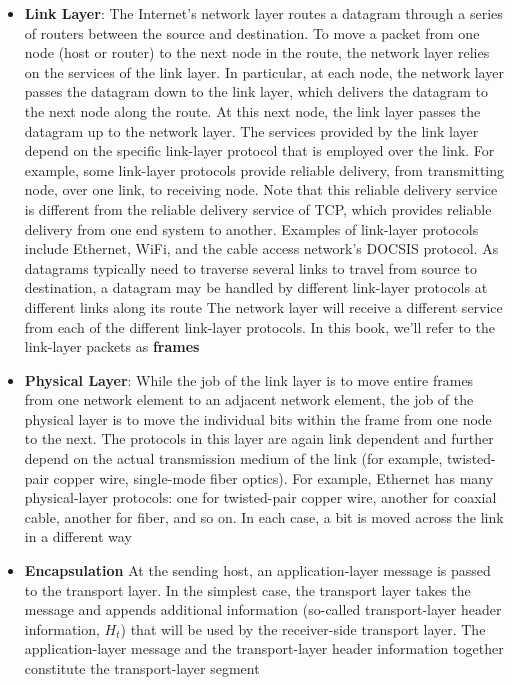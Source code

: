 \documentclass{report}
\begin{document}
\begin{itemize}
        \item \textbf{Link Layer}:  The Internet’s network layer routes a datagram through a series of routers between the source and destination. To move a packet from one node (host or router) to the next node in the route, the network layer relies on the services of the link layer. In particular, at each node, the network layer passes the datagram down to the link layer, which delivers the datagram to the next node along the route. At this next node, the link layer passes the datagram up to the network layer.
            \bigbreak \noindent 
            The services provided by the link layer depend on the specific link-layer protocol that is employed over the link. For example, some link-layer protocols provide reliable delivery, from transmitting node, over one link, to receiving node. Note that this reliable delivery service is different from the reliable delivery service of TCP, which provides reliable delivery from one end system to another. Examples of link-layer protocols include Ethernet, WiFi, and the cable access network’s DOCSIS protocol. As datagrams typically need to traverse several links to travel from source to destination, a datagram may be handled by different link-layer protocols at different links along its route
            \bigbreak \noindent 
            The network layer will receive a different service from each of the different link-layer protocols. In this book, we’ll refer to the link-layer packets as \textbf{frames}
        \item \textbf{Physical Layer}: While the job of the link layer is to move entire frames from one network element to an adjacent network element, the job of the physical layer is to move the individual bits within the frame from one node to the next. The protocols in this layer are again link dependent and further depend on the actual transmission medium of the link (for example, twisted-pair copper wire, single-mode fiber optics). For example, Ethernet has many physical-layer protocols: one for twisted-pair copper wire, another for coaxial cable, another for fiber, and so on. In each case, a bit is moved across the link in a different way
        \item \textbf{Encapsulation}
            \bigbreak \noindent 
            \bigbreak \noindent 
            At the sending host, an application-layer message  is passed to the transport layer. In the simplest case, the transport layer takes the message and appends additional information (so-called transport-layer header information, $H_{t}$) that will be used by the receiver-side transport layer. The application-layer message and the transport-layer header information together constitute the transport-layer segment

\end{itemize}
\end{document}
